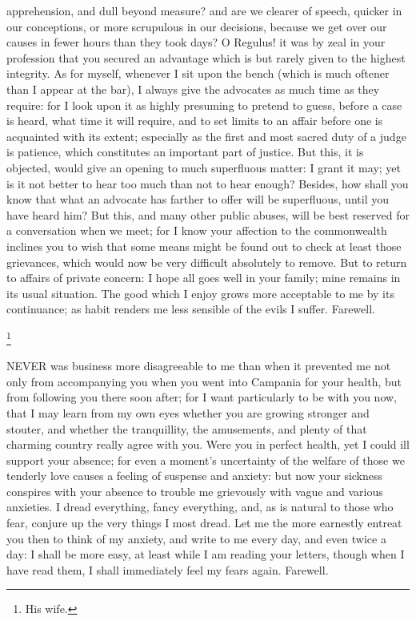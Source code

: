 apprehension, and dull beyond measure? and are we clearer of speech,
quicker in our conceptions, or more scrupulous in our decisions, because
we get over our causes in fewer hours than they took days? O Regulus! it
was by zeal in your profession that you secured an advantage which is but
rarely given to the highest integrity. As for myself, whenever I sit upon
the bench (which is much oftener than I appear at the bar), I always give
the advocates as much time as they require: for I look upon it as highly
presuming to pretend to guess, before a case is heard, what time it will
require, and to set limits to an affair before one is acquainted with its
extent; especially as the first and most sacred duty of a judge is
patience, which constitutes an important part of justice. But this, it is
objected, would give an opening to much superfluous matter: I grant it
may; yet is it not better to hear too much than not to hear enough?
Besides, how shall you know that what an advocate has farther to offer
will be superfluous, until you have heard him? But this, and many other
public abuses, will be best reserved for a conversation when we meet; for
I know your affection to the commonwealth inclines you to wish that some
means might be found out to check at least those grievances, which would
now be very difficult absolutely to remove. But to return to affairs of
private concern: I hope all goes well in your family; mine remains in its
usual situation. The good which I enjoy grows more acceptable to me by its
continuance; as habit renders me less sensible of the evils I suffer.
Farewell.


\footnote{His wife.}

NEVER was business more disagreeable to me than when it prevented me not
only from accompanying you when you went into Campania for your health,
but from following you there soon after; for I want particularly to be
with you now, that I may learn from my own eyes whether you are growing
stronger and stouter, and whether the tranquillity, the amusements, and
plenty of that charming country really agree with you. Were you in perfect
health, yet I could ill support your absence; for even a moment's
uncertainty of the welfare of those we tenderly love causes a feeling of
suspense and anxiety: but now your sickness conspires with your absence to
trouble me grievously with vague and various anxieties. I dread
everything, fancy everything, and, as is natural to those who fear,
conjure up the very things I most dread. Let me the more earnestly entreat
you then to think of my anxiety, and write to me every day, and even twice
a day: I shall be more easy, at least while I am reading your letters,
though when I have read them, I shall immediately feel my fears again.
Farewell.

